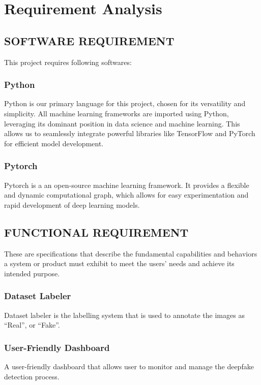       \chapter{Requirement Analysis}
        \section{SOFTWARE REQUIREMENT}
            This project requires following softwares:
            \subsection*{Python} 
            Python is our primary language for this project, chosen for its versatility and simplicity. All machine learning frameworks are imported using
            Python, leveraging its dominant position in data science and machine learning. This allows us to seamlessly integrate powerful libraries like TensorFlow and PyTorch for efficient model development.
        
            \subsection*{Pytorch}
            Pytorch is a an open-source machine learning framework. It provides a flexible and dynamic computational graph, which allows for easy experimentation and rapid development of deep learning models. 
                
        \section{FUNCTIONAL REQUIREMENT}
            These are specifications that describe the fundamental capabilities and behaviors a system or product must exhibit to meet the users' needs and achieve its intended purpose. 

            \subsection{Dataset Labeler}
                Dataset labeler is the labelling system that is used to annotate the images as “Real”, or “Fake”.

            \subsection{User-Friendly Dashboard}
                A user-friendly dashboard that allows user to monitor and manage the deepfake detection process.

